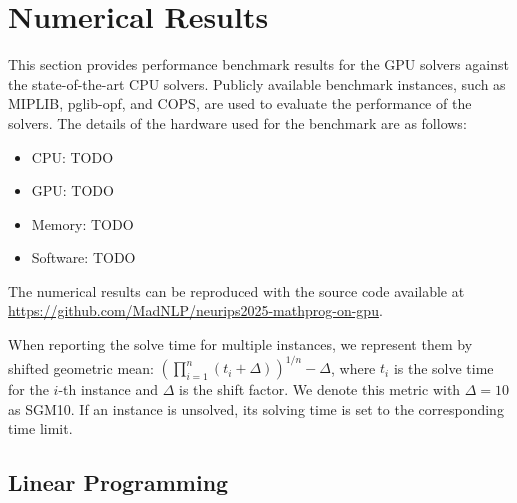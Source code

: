 \documentclass{article}
\begin{document}
\section{Numerical Results}\label{eqn:num}
This section provides performance benchmark results for the GPU solvers against the state-of-the-art CPU solvers.
Publicly available benchmark instances, such as MIPLIB, pglib-opf, and COPS, are used to evaluate the performance of the solvers.
The details of the hardware used for the benchmark are as follows:
\begin{itemize}[leftmargin=*,itemsep=0pt,parsep=0pt,partopsep=0pt]
\item CPU: TODO
\item GPU: TODO
\item Memory: TODO
\item Software: TODO
\end{itemize}
The numerical results can be reproduced with the source code available at \url{https://github.com/MadNLP/neurips2025-mathprog-on-gpu}.

When reporting the solve time for multiple instances, we represent them by shifted geometric mean: $\left(\prod_{i=1}^n (t_i + \Delta)\right)^{1/n} - \Delta$, where $t_i$ is the solve time for the $i$-th instance and $\Delta$ is the shift factor. We denote this metric with $\Delta = 10$ as SGM10. If an instance is unsolved, its solving time is set to the corresponding time limit.

\subsection{Linear Programming}
\end{document}
